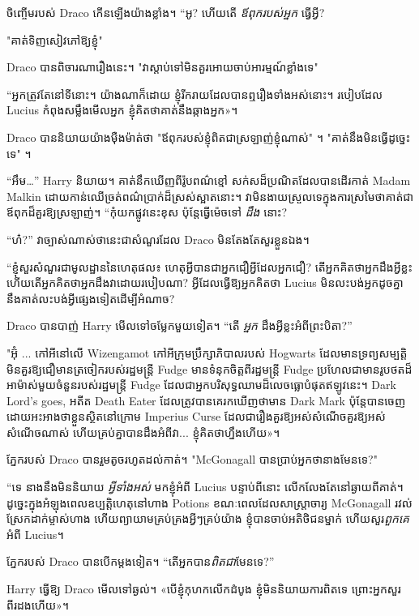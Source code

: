 ចិញ្ចើមរបស់ Draco កើនឡើងយ៉ាងខ្លាំង។ “អូ? ហើយតើ \emph{ឪពុករបស់អ្នក} ធ្វើអ្វី?

"គាត់ទិញសៀវភៅឱ្យខ្ញុំ"

Draco បានពិចារណារឿងនេះ។ "វាស្តាប់ទៅមិនគួរអោយចាប់អារម្មណ៍ខ្លាំងទេ"

“អ្នកត្រូវតែនៅទីនោះ។ យ៉ាង​ណា​ក៏​ដោយ ខ្ញុំ​រីករាយ​ដែល​បាន​ឮ​រឿង​ទាំង​អស់​នោះ។ របៀបដែល Lucius កំពុងសម្លឹងមើលអ្នក ខ្ញុំគិតថាគាត់នឹងឆ្កាងអ្នក»។

Draco បាននិយាយយ៉ាងម៉ឺងម៉ាត់ថា "ឪពុករបស់ខ្ញុំពិតជាស្រឡាញ់ខ្ញុំណាស់" ។ "គាត់នឹងមិនធ្វើដូច្នេះទេ" ។

“អឹម…” Harry និយាយ។ គាត់​នឹក​ឃើញ​ពី​រ៉ូប​ពណ៌​ខ្មៅ សក់​ស​ដ៏​ប្រណិត​ដែល​បាន​ដើរ​កាត់​ Madam Malkin ដោយ​កាន់​ឈើ​ច្រត់​ពណ៌​ប្រាក់​ដ៏​ស្រស់​ស្អាត​នោះ។ វាមិនងាយស្រួលទេក្នុងការស្រមៃថាគាត់ជាឪពុកដ៏គួរឱ្យស្រឡាញ់។ “កុំ​យក​ផ្លូវ​នេះ​ខុស ប៉ុន្តែ​ធ្វើ​ម៉េច​ទៅ \emph{ដឹង} នោះ?

“ហ៎?” វាច្បាស់ណាស់ថានេះជាសំណួរដែល Draco មិនតែងតែសួរខ្លួនឯង។

“ខ្ញុំសួរសំណួរជាមូលដ្ឋាននៃហេតុផល៖ ហេតុអ្វីបានជាអ្នកជឿអ្វីដែលអ្នកជឿ? តើអ្នកគិតថាអ្នកដឹងអ្វីខ្លះ ហើយតើអ្នកគិតថាអ្នកដឹងវាដោយរបៀបណា? អ្វី​ដែល​ធ្វើ​ឱ្យ​អ្នក​គិត​ថា Lucius មិន​លះបង់​អ្នក​ដូច​គ្នា​នឹង​គាត់​លះបង់​អ្វី​ផ្សេង​ទៀត​ដើម្បី​អំណាច?

Draco បានបាញ់ Harry មើលទៅចម្លែកមួយទៀត។ “តើ \emph{អ្នក} ដឹងអ្វីខ្លះអំពីព្រះបិតា?”

"អ៊ុំ ... កៅអីនៅលើ Wizengamot កៅអីក្រុមប្រឹក្សាភិបាលរបស់ Hogwarts ដែលមានទ្រព្យសម្បត្តិមិនគួរឱ្យជឿមានត្រចៀករបស់រដ្ឋមន្ត្រី Fudge មានទំនុកចិត្តពីរដ្ឋមន្ត្រី Fudge ប្រហែលជាមានរូបថតដ៏អាម៉ាស់មួយចំនួនរបស់រដ្ឋមន្ត្រី Fudge ដែលជាអ្នកបរិសុទ្ធឈាមដ៏លេចធ្លោបំផុតឥឡូវនេះ។ Dark Lord's goes, អតីត Death Eater ដែលត្រូវបានគេរកឃើញថាមាន Dark Mark ប៉ុន្តែបានចេញដោយអះអាងថាខ្លួនស្ថិតនៅក្រោម Imperius Curse ដែលជារឿងគួរឱ្យអស់សំណើចគួរឱ្យអស់សំណើចណាស់ ហើយគ្រប់គ្នាបានដឹងអំពីវា... ខ្ញុំ​គិត​ថា​ហ្នឹង​ហើយ»។

ភ្នែករបស់ Draco បានរួមតូចរហូតដល់កាត់។ "McGonagall បានប្រាប់អ្នកថានាងមែនទេ?"

“ទេ នាងនឹងមិននិយាយ \emph{អ្វីទាំងអស់} មកខ្ញុំអំពី Lucius បន្ទាប់ពីនោះ លើកលែងតែនៅឆ្ងាយពីគាត់។ ដូច្នេះក្នុងអំឡុងពេលឧប្បត្តិហេតុនៅហាង Potions ខណៈពេលដែលសាស្រ្តាចារ្យ McGonagall រវល់ស្រែកដាក់ម្ចាស់ហាង ហើយព្យាយាមគ្រប់គ្រងអ្វីៗគ្រប់យ៉ាង ខ្ញុំបានចាប់អតិថិជនម្នាក់ ហើយសួរ\emph{ពួកគេ}អំពី Lucius។

ភ្នែករបស់ Draco បានបើកម្តងទៀត។ “តើអ្នកបាន\emph{ពិតជា}មែនទេ?”

Harry ធ្វើឱ្យ Draco មើលទៅឆ្ងល់។ «​បើ​ខ្ញុំ​កុហក​លើក​ដំបូង ខ្ញុំ​មិន​និយាយ​ការពិត​ទេ ព្រោះ​អ្នក​សួរ​ពីរដង​ហើយ​»​។

